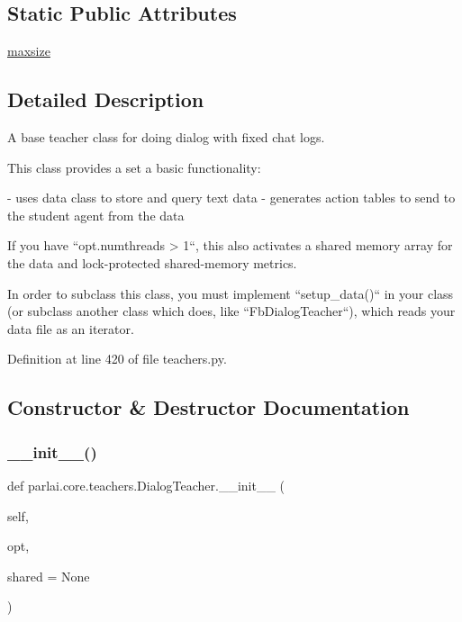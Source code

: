 \subsection*{Static Public Attributes}
\begin{DoxyCompactItemize}
\item 
\hyperlink{classparlai_1_1core_1_1teachers_1_1DialogTeacher_aa0637cf3392baf2e9c965de7ffc812ac}{maxsize}
\end{DoxyCompactItemize}


\subsection{Detailed Description}
\begin{DoxyVerb}A base teacher class for doing dialog with fixed chat logs.

This class provides a set a basic functionality:

- uses data class to store and query text data
- generates action tables to send to the student agent from the data

If you have ``opt.numthreads > 1``, this also activates a shared memory
array for the data and lock-protected shared-memory metrics.

In order to subclass this class, you must implement ``setup_data()`` in
your class (or subclass another class which does, like
``FbDialogTeacher``), which reads your data file as an iterator.
\end{DoxyVerb}
 

Definition at line 420 of file teachers.\+py.



\subsection{Constructor \& Destructor Documentation}
\mbox{\label{classparlai_1_1core_1_1teachers_1_1DialogTeacher_a9385b9ae914ef84be6b54107811b202b}} 
\subsubsection{\texorpdfstring{\+\_\+\+\_\+init\+\_\+\+\_\+()}{\_\_init\_\_()}}
{\footnotesize\ttfamily def parlai.\+core.\+teachers.\+Dialog\+Teacher.\+\_\+\+\_\+init\+\_\+\+\_\+ (\begin{DoxyParamCaption}\item[{}]{self,  }\item[{}]{opt,  }\item[{}]{shared = {\ttfamily None} }\end{DoxyParamCaption})}



